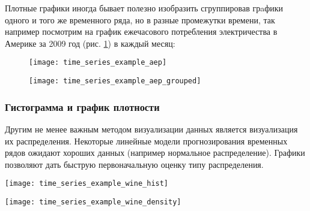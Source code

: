 Плотные графики иногда бывает полезно изобразить сгруппировав 
грaфики одного и того же временного ряда, но в разные промежутки времени, так например 
посмотрим на график ежечасового потребления электричества в Америке за 2009 год 
(рис. \ref{fig:time_series_example_aep}) 
в каждый месяц:

\begin{figure}[h!]
    \centering
    \texttt{[image: time\_series\_example\_aep]}
    \label{fig:time_series_example_aep}
\end{figure}

\newpage

\begin{figure}[h!]
    \centering
    \texttt{[image: time\_series\_example\_aep\_grouped]}
    \label{fig:time_series_example_aep_grouped}
\end{figure}

\subsubsection{Гистограмма и график плотности}

Другим не менее важным методом визуализации данных является визуализация 
их распределения. 
Некоторые линейные модели прогнозирования временных рядов ожидают 
\guillemotleft хороших\guillemotright {} данных (например нормальное распределение). 
Графики позволяют дать быструю первоначальную оценку типу распределения.

\begin{center}
    \begin{minipage}{0.4\textwidth}
        \centering
        \texttt{[image: time\_series\_example\_wine\_hist]}
        \label{fig:time_series_example_wine_hist}
    \end{minipage}
    \hfill
    \begin{minipage}{0.4\textwidth}
        \centering
        \texttt{[image: time\_series\_example\_wine\_density]}
        \label{fig:time_series_example_wine_density}
    \end{minipage}
\end{center}


